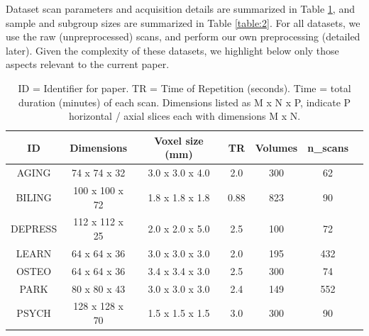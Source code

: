 \documentclass[12pt]{spieman}  %
\begin{document}
\begin{spacing}{2}
Dataset scan parameters and acquisition details are summarized in Table \ref{table:1}, and sample
and subgroup sizes are summarized in Table \ref{table:2}. For all datasets, we use the raw
(unpreprocessed) scans, and perform our own preprocessing (detailed later). Given the complexity of
these datasets, we highlight below only those aspects relevant to the current paper.

\begin{table}[h!]
\caption{
    ID = Identifier for paper. TR = Time of Repetition (seconds).
    Time = total duration (minutes) of each scan. Dimensions listed as M x N x P,
    indicate P horizontal / axial slices each with dimensions M x N.
}
\label{table:1}
\small
\centering
\begin{tabular}{ c c c c c c c }
\hline
\textbf{ID}    & \textbf{Dimensions}  & \textbf{Voxel size (mm)} & \textbf{TR} & \textbf{Volumes} & \textbf{n\_scans} \\
\hline
AGING     & 74 x 74 x 32   & 3.0 x 3.0 x 4.0 & 2.0  & 300 & 62  \\
BILING    & 100 x 100 x 72 & 1.8 x 1.8 x 1.8 & 0.88 & 823 & 90  \\
DEPRESS   & 112 x 112 x 25 & 2.0 x 2.0 x 5.0 & 2.5  & 100 & 72  \\
LEARN     & 64 x 64 x 36   & 3.0 x 3.0 x 3.0 & 2.0  & 195 & 432 \\
OSTEO     & 64 x 64 x 36   & 3.4 x 3.4 x 3.0 & 2.5  & 300 & 74  \\
PARK      & 80 x 80 x 43   & 3.0 x 3.0 x 3.0 & 2.4  & 149 & 552 \\
PSYCH     & 128 x 128 x 70 & 1.5 x 1.5 x 1.5 & 3.0  & 300 & 90  \\
\hline
\end{tabular}


\end{table}


\end{spacing}
\end{document}
